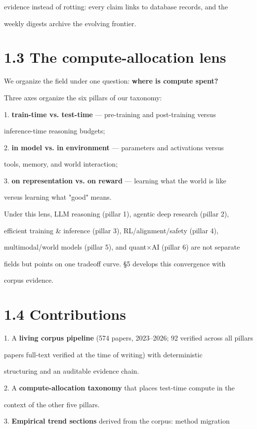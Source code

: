 \documentclass[11pt]{article}
\begin{document}
evidence instead of rotting: every claim links to database records, and the

weekly digests archive the evolving frontier.


\section{1.3 The compute-allocation lens}

We organize the field under one question: \textbf{where is compute spent?}

Three axes organize the six pillars of our taxonomy:


1. \textbf{train-time vs. test-time} --- pre-training and post-training versus

inference-time reasoning budgets;

2. \textbf{in model vs. in environment} --- parameters and activations versus

tools, memory, and world interaction;

3. \textbf{on representation vs. on reward} --- learning what the world is like

versus learning what "good" means.


Under this lens, LLM reasoning (pillar 1), agentic deep research (pillar 2),

efficient training \& inference (pillar 3), RL/alignment/safety (pillar 4),

multimodal/world models (pillar 5), and quant$\times$AI (pillar 6) are not separate

fields but points on one tradeoff curve. \S5 develops this convergence with

corpus evidence.


\section{1.4 Contributions}

1. A \textbf{living corpus pipeline} (574 papers, 2023--2026; 92 verified across all pillars

papers full-text verified at the time of writing) with deterministic

structuring and an auditable evidence chain.

2. A \textbf{compute-allocation taxonomy} that places test-time compute in the

context of the other five pillars.

3. \textbf{Empirical trend sections} derived from the corpus: method migration
\end{document}
